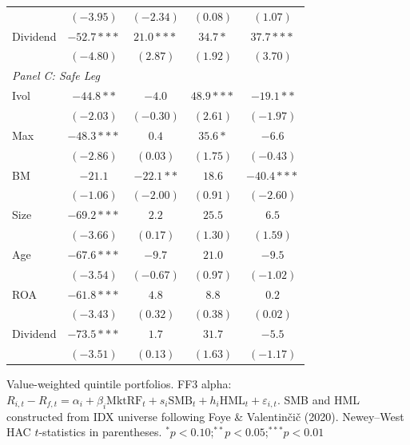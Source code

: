 \begin{tabular}{l c c c c}
 & $(-3.95)$ & $(-2.34)$ & $(0.08)$ & $(1.07)$ \\
Dividend & $-52.7***$ & $21.0***$ & $34.7*$ & $37.7***$ \\
 & $(-4.80)$ & $(2.87)$ & $(1.92)$ & $(3.70)$ \\
\midrule
\multicolumn{5}{l}{\textit{Panel C: Safe Leg}} \\
Ivol & $-44.8**$ & $-4.0$ & $48.9***$ & $-19.1**$ \\
 & $(-2.03)$ & $(-0.30)$ & $(2.61)$ & $(-1.97)$ \\
Max & $-48.3***$ & $0.4$ & $35.6*$ & $-6.6$ \\
 & $(-2.86)$ & $(0.03)$ & $(1.75)$ & $(-0.43)$ \\
BM & $-21.1$ & $-22.1**$ & $18.6$ & $-40.4***$ \\
 & $(-1.06)$ & $(-2.00)$ & $(0.91)$ & $(-2.60)$ \\
Size & $-69.2***$ & $2.2$ & $25.5$ & $6.5$ \\
 & $(-3.66)$ & $(0.17)$ & $(1.30)$ & $(1.59)$ \\
Age & $-67.6***$ & $-9.7$ & $21.0$ & $-9.5$ \\
 & $(-3.54)$ & $(-0.67)$ & $(0.97)$ & $(-1.02)$ \\
ROA & $-61.8***$ & $4.8$ & $8.8$ & $0.2$ \\
 & $(-3.43)$ & $(0.32)$ & $(0.38)$ & $(0.02)$ \\
Dividend & $-73.5***$ & $1.7$ & $31.7$ & $-5.5$ \\
 & $(-3.51)$ & $(0.13)$ & $(1.63)$ & $(-1.17)$ \\
\bottomrule
\end{tabular}
\vspace{4pt}
\begin{minipage}{0.9\textwidth}
\footnotesize
Value-weighted quintile portfolios. FF3 alpha: $R_{i,t} - R_{f,t} = \alpha_i + \beta_i \mathrm{MktRF}_t + s_i \mathrm{SMB}_t + h_i \mathrm{HML}_t + \varepsilon_{i,t}$. SMB and HML constructed from IDX universe following Foye \& Valentin\v{c}i\v{c} (2020).
Newey--West HAC $t$-statistics in parentheses.
$^{*}p<0.10$;\quad $^{**}p<0.05$;\quad $^{***}p<0.01$
\end{minipage}